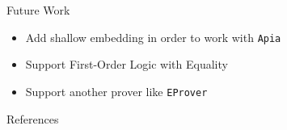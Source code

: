 \documentclass[xetex, hyperref={pdfpagelabels=false}]{beamer}
\begin{document}
\begin{frame}[label=future-work]{Future Work}
\begin{itemize}
  \item Add shallow embedding in order to work with \texttt{Apia}
  \item Support First-Order Logic with Equality
  \item Support another prover like \texttt{EProver}\textbf{
}\end{itemize}
\end{frame}


\begin{frame}[label=references]{References}
\printbibliography
\end{frame}
\end{document}

